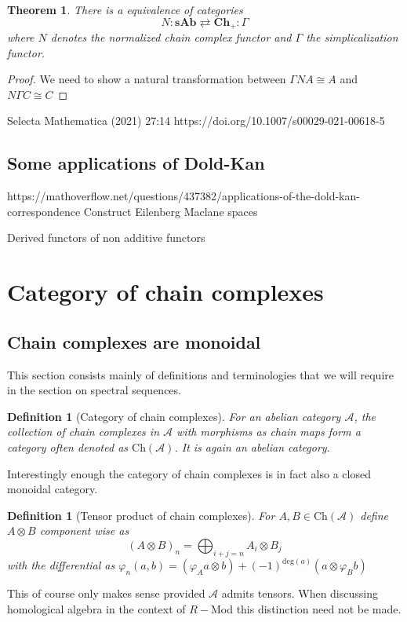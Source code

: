 \documentclass[12pt]{report}
\numberwithin{equation}{section}
\newtheorem{theorem}[dummy]{Theorem}
\newtheorem{definition}[dummy]{Definition}
\begin{document}
	\begin{theorem}
		There is a equivalence of categories $$N:\mathbf{sAb}\rightleftarrows \mathbf{Ch}_+: \Gamma$$ where $N$ denotes the normalized chain complex functor and $\Gamma$ the simplicalization functor.
	\end{theorem}
	\begin{proof}
		We need to show a natural transformation between $\Gamma N A \cong A$ and $N \Gamma C \cong C$
	\end{proof}
	Selecta Mathematica (2021) 27:14
	https://doi.org/10.1007/s00029-021-00618-5	
	\subsection{Some applications of Dold-Kan}
	https://mathoverflow.net/questions/437382/applications-of-the-dold-kan-correspondence
	Construct Eilenberg Maclane spaces
	
	Derived functors of non additive functors
	\section{Category of chain complexes}
	\subsection{Chain complexes are monoidal}
	This section consists mainly of definitions and terminologies that we will require in the section on spectral sequences.
	\begin{definition}[Category of chain complexes]
		For an abelian category $\mathcal{A}$, the collection of chain complexes in $\mathcal{A}$ with morphisms as chain maps form a category often denoted as $\mathrm{Ch}(\mathcal{A})$. It is again an abelian category.
	\end{definition}
	Interestingly enough the category of chain complexes is in fact also a closed monoidal category.
	
	\begin{definition}[Tensor product of chain complexes]\label{tensorchain}
		For $A, B \in \mathrm{Ch}(\mathcal{A})$ define $A \otimes B$ component wise as \[ (A \otimes B)_n = \bigoplus_{i+j=n} A_i \otimes B_j\] with the differential as $ \varphi_n(a,b)=(\varphi_Aa\otimes b)+(-1)^{\mathrm{deg}(a)}(a \otimes \varphi_B b)$
	\end{definition}
	This of course only makes sense provided $\mathcal{A}$ admits tensors. When discussing homological algebra in the context of $R-$Mod this distinction need not be made.
	
\end{document}

